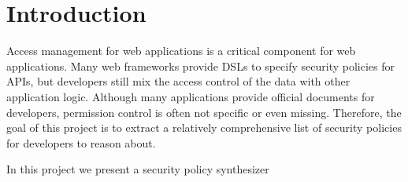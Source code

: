 \section{Introduction}%


Access management for web applications is a critical component for web
applications.
Many web frameworks provide DSLs to specify security policies for APIs, but
developers still mix the access control of the data with other application
logic.
Although many applications provide official documents for developers,
permission control is often not specific or even missing.
%
Therefore, the goal of this project is to extract a relatively comprehensive
list of security policies for developers to reason about.


In this project we present a security policy synthesizer




